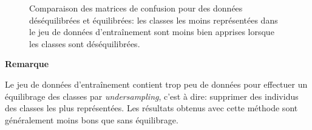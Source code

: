 \begin{figure}
    \centering
    \qquad
    \caption{Comparaison des matrices de confusion pour des données déséquilibrées et équilibrées: les classes les moins représentées dans le jeu de données d'entraînement sont moins bien apprises lorsque les classes sont déséquilibrées.}
    \label{confusion}
\end{figure}

\noindent
\begin{minipage}[!hc]{0.12\textwidth}
   \textbf{Remarque}
\end{minipage}
\vrule\enskip\vrule\quad\begin{minipage}{\dimexpr 0.87\textwidth-0.8pt-1.5em}
Le jeu de données d'entraînement contient trop peu de données pour effectuer un équilibrage des classes par \textit{undersampling}, c'est à dire: supprimer des individus des classes les plus représentées. Les résultats obtenus avec cette méthode sont généralement moins bons que sans équilibrage.
\end{minipage}